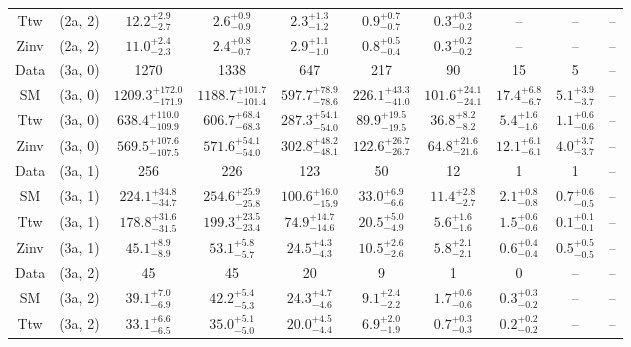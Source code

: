 \begin{table}[h!]
{\begin{tabular}{cccccccccc}
	Ttw & (2a, 2) & $12.2^{+ 2.9 }_{- 2.7 }$ & $2.6^{+ 0.9 }_{- 0.9 }$ & $2.3^{+ 1.3 }_{- 1.2 }$ & $0.9^{+ 0.7 }_{- 0.7 }$ & $0.3^{+ 0.3 }_{- 0.2 }$ & -- & -- & -- \\[0.5ex] 
	Zinv & (2a, 2) & $11.0^{+ 2.4 }_{- 2.3 }$ & $2.4^{+ 0.8 }_{- 0.7 }$ & $2.9^{+ 1.1 }_{- 1.0 }$ & $0.8^{+ 0.5 }_{- 0.4 }$ & $0.3^{+ 0.2 }_{- 0.2 }$ & -- & -- & -- \\[0.5ex] 
	Data & (3a, 0) & 1270 & 1338 & 647 & 217 & 90 & 15 & 5 & -- \\[0.5ex] 
	SM & (3a, 0) & $1209.3^{+ 172.0 }_{- 171.9 }$ & $1188.7^{+ 101.7 }_{- 101.4 }$ & $597.7^{+ 78.9 }_{- 78.6 }$ & $226.1^{+ 43.3 }_{- 41.0 }$ & $101.6^{+ 24.1 }_{- 24.1 }$ & $17.4^{+ 6.8 }_{- 6.7 }$ & $5.1^{+ 3.9 }_{- 3.7 }$ & -- \\[0.5ex] 
	Ttw & (3a, 0) & $638.4^{+ 110.0 }_{- 109.9 }$ & $606.7^{+ 68.4 }_{- 68.3 }$ & $287.3^{+ 54.1 }_{- 54.0 }$ & $89.9^{+ 19.5 }_{- 19.5 }$ & $36.8^{+ 8.2 }_{- 8.2 }$ & $5.4^{+ 1.6 }_{- 1.6 }$ & $1.1^{+ 0.6 }_{- 0.6 }$ & -- \\[0.5ex] 
	Zinv & (3a, 0) & $569.5^{+ 107.6 }_{- 107.5 }$ & $571.6^{+ 54.1 }_{- 54.0 }$ & $302.8^{+ 48.2 }_{- 48.1 }$ & $122.6^{+ 26.7 }_{- 26.7 }$ & $64.8^{+ 21.6 }_{- 21.6 }$ & $12.1^{+ 6.1 }_{- 6.1 }$ & $4.0^{+ 3.7 }_{- 3.7 }$ & -- \\[0.5ex] 
	Data & (3a, 1) & 256 & 226 & 123 & 50 & 12 & 1 & 1 & -- \\[0.5ex] 
	SM & (3a, 1) & $224.1^{+ 34.8 }_{- 34.7 }$ & $254.6^{+ 25.9 }_{- 25.8 }$ & $100.6^{+ 16.0 }_{- 15.9 }$ & $33.0^{+ 6.9 }_{- 6.6 }$ & $11.4^{+ 2.8 }_{- 2.7 }$ & $2.1^{+ 0.8 }_{- 0.8 }$ & $0.7^{+ 0.6 }_{- 0.5 }$ & -- \\[0.5ex] 
	Ttw & (3a, 1) & $178.8^{+ 31.6 }_{- 31.5 }$ & $199.3^{+ 23.5 }_{- 23.4 }$ & $74.9^{+ 14.7 }_{- 14.6 }$ & $20.5^{+ 5.0 }_{- 4.9 }$ & $5.6^{+ 1.6 }_{- 1.6 }$ & $1.5^{+ 0.6 }_{- 0.6 }$ & $0.1^{+ 0.1 }_{- 0.1 }$ & -- \\[0.5ex] 
	Zinv & (3a, 1) & $45.1^{+ 8.9 }_{- 8.9 }$ & $53.1^{+ 5.8 }_{- 5.7 }$ & $24.5^{+ 4.3 }_{- 4.3 }$ & $10.5^{+ 2.6 }_{- 2.6 }$ & $5.8^{+ 2.1 }_{- 2.1 }$ & $0.6^{+ 0.4 }_{- 0.4 }$ & $0.5^{+ 0.5 }_{- 0.5 }$ & -- \\[0.5ex] 
	Data & (3a, 2) & 45 & 45 & 20 & 9 & 1 & 0 & -- & -- \\[0.5ex] 
	SM & (3a, 2) & $39.1^{+ 7.0 }_{- 6.9 }$ & $42.2^{+ 5.4 }_{- 5.3 }$ & $24.3^{+ 4.7 }_{- 4.6 }$ & $9.1^{+ 2.4 }_{- 2.2 }$ & $1.7^{+ 0.6 }_{- 0.6 }$ & $0.3^{+ 0.3 }_{- 0.2 }$ & -- & -- \\[0.5ex] 
	Ttw & (3a, 2) & $33.1^{+ 6.6 }_{- 6.5 }$ & $35.0^{+ 5.1 }_{- 5.0 }$ & $20.0^{+ 4.5 }_{- 4.4 }$ & $6.9^{+ 2.0 }_{- 1.9 }$ & $0.7^{+ 0.3 }_{- 0.3 }$ & $0.2^{+ 0.2 }_{- 0.2 }$ & -- & -- \\[0.5ex] 

\end{tabular}}
\end{table}
